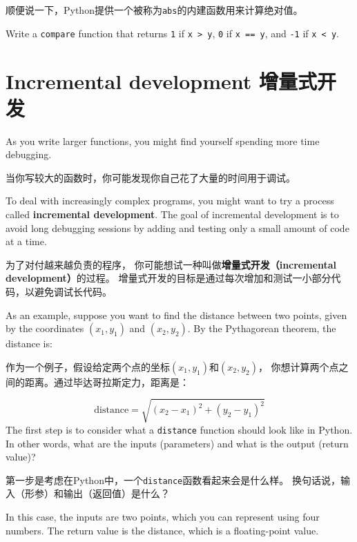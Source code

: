 \documentclass[10pt]{book}
\begin{document}
\begin{CJK}{UTF8}{gbsn}
顺便说一下，Python提供一个被称为{\tt abs}的内建函数用来计算绝对值。

\begin{exercise}

Write a {\tt compare} function
that returns {\tt 1} if {\tt x > y},
{\tt 0} if {\tt x == y}, and {\tt -1} if {\tt x < y}.
\end{exercise}


\section{Incremental development 增量式开发}
\label{incremental.development}

As you write larger functions, you might find yourself
spending more time debugging.

当你写较大的函数时，你可能发现你自己花了大量的时间用于调试。

To deal with increasingly complex programs,
you might want to try a process called
{\bf incremental development}.  The goal of incremental development
is to avoid long debugging sessions by adding and testing only
a small amount of code at a time.

为了对付越来越负责的程序，
你可能想试一种叫做{\bf 增量式开发（incremental development）}的过程。
增量式开发的目标是通过每次增加和测试一小部分代码，以避免调试长代码。

As an example, suppose you want to find the distance between two
points, given by the coordinates $(x_1, y_1)$ and $(x_2, y_2)$.
By the Pythagorean theorem, the distance is:

作为一个例子，假设给定两个点的坐标$(x_1, y_1)$和$(x_2, y_2)$，
你想计算两个点之间的距离。通过毕达哥拉斯定力，距离是：

\begin{displaymath}
\mathrm{distance} = \sqrt{(x_2 - x_1)^2 + (y_2 - y_1)^2}
\end{displaymath}
%
The first step is to consider what a {\tt distance} function should
look like in Python.  In other words, what are the inputs (parameters)
and what is the output (return value)?

第一步是考虑在Python中，一个{\tt distance}函数看起来会是什么样。
换句话说，输入（形参）和输出（返回值）是什么？

In this case, the inputs are two points, which you can represent
using four numbers.  The return value is the distance, which is
a floating-point value.


\end{CJK}
\end{document}
